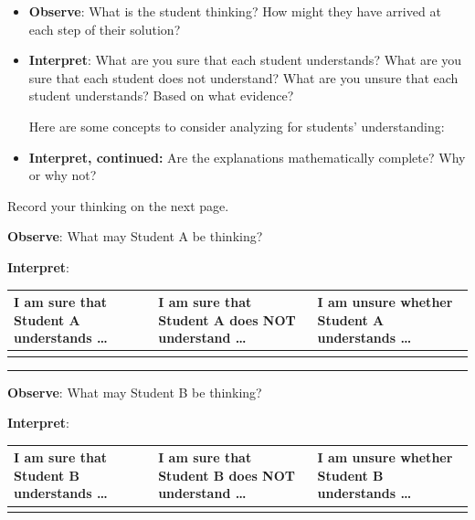 \documentclass[11pt]{article}
\theoremstyle{definition}
\begin{document}
\begin{itemize}
\item {\bf Observe}: What is the student thinking? How might they have arrived at each step of their solution?
\item {\bf Interpret}: What are you sure that each student understands? What are you sure that each student
does not understand? What are you unsure that each student understands?  Based on what evidence?

Here are some concepts to consider analyzing for students' understanding:

	\vspace*{-2pt}
	
\item {\bf Interpret, continued:} Are the explanations mathematically complete? Why or why not?
	
\end{itemize}

Record your thinking on the next page.

\newpage

{\bf Observe}: What may Student A be thinking?

{\bf Interpret}: 

\begin{tabular}{C{1.75in}|C{1.75in}|C{1.75in}}
I am sure that Student A understands \dots  & I am sure that Student A
does NOT understand \dots & I am unsure whether
Student A understands \dots  \\ \hline
& & \vspace*{1.75in}\\
\end{tabular}
\vspace*{2pt}
\hrule
\vspace*{2pt}

{\bf Observe}: What may Student B be thinking?

{\bf Interpret}: 

\begin{tabular}{C{1.75in}|C{1.75in}|C{1.75in}}
I am sure that Student B understands \dots  & I am sure that Student B
does NOT understand \dots & I am unsure whether
Student B understands \dots  \\ \hline
& & \vspace*{1.75in}\\
\end{tabular}
\end{document}
